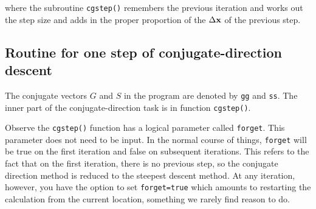 where
the subroutine {\tt cgstep()}
remembers the previous iteration and
works out the step size and adds in
the proper proportion of the $\Delta \bold x$ of
the previous step.


\subsection{Routine for one step of conjugate-direction descent}
\par
\begin{comment}
The \bx{conjugate-direction program}
can be divided into two parts:
an inner part that is used almost without change
over a wide variety of applications,
and an outer part containing memory allocations,
operator invocations, and initializations.

Because \bx{Fortran} does not recognize the difference between upper- and
lower-case letters,
\end{comment}
The conjugate vectors $G$ and $S$ in the program are denoted by
{\tt gg} and {\tt ss}.
The inner part of the conjugate-direction task is in
function {\tt cgstep()}.%
\par
Observe the \texttt{cgstep()} function has a logical parameter
called \texttt{forget}.
This parameter does not need to be input.
In the normal course of things, \texttt{forget} will be true
on the first iteration and false on subsequent iterations.
This refers to the fact that on the first iteration,
there is no previous step,
so the conjugate direction method
is reduced to the steepest descent method.
At any iteration, however, you have the option to set
\texttt{forget=true}
which amounts to restarting the calculation
from the current location,
something we rarely find reason to do.


